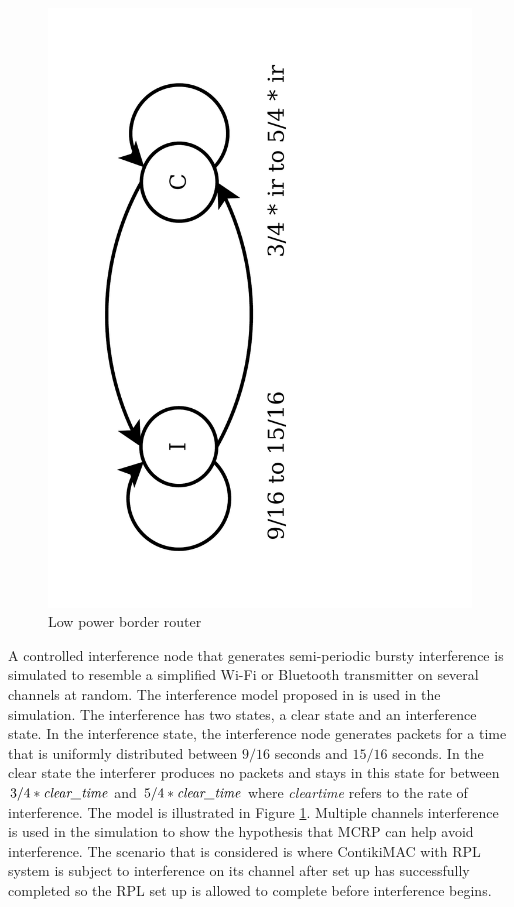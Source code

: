 \begin{figure}
\centering
\includegraphics[trim=2cm 2cm 8cm 2cm, clip=true, totalheight=0.33\textheight, angle=270]{interferenceModel.pdf}
\caption{Low power border router}
\label{fig_interferenceModel}
\end{figure}

A controlled interference node that generates semi-periodic bursty interference is simulated to resemble a simplified Wi-Fi or Bluetooth transmitter on several channels at random. The interference model proposed in \cite{interferenceModel} is used in the simulation. The interference has two states, a clear state and an interference state. 
In the interference state, the interference node generates packets for a time that is uniformly distributed between $9/16$ seconds and $15/16$ seconds. In the clear state the interferer produces no packets and stays in this state for between $3/4 * \emph{clear\textunderscore time}$ and $5/4 * \emph{clear\textunderscore time}$ where \emph{clear\textunderscore time} refers to the rate of interference. The model is illustrated in Figure \ref{fig_interferenceModel}.
Multiple channels interference is used in the simulation to show the hypothesis that MCRP can help avoid interference. The scenario that is considered is where ContikiMAC with RPL system is subject to interference on its channel after set up has successfully completed so the RPL set up is allowed to complete before interference begins.

